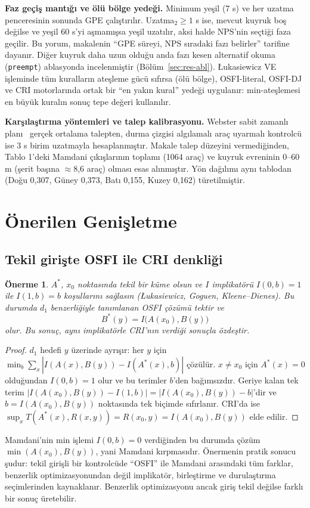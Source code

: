 \documentclass[11pt,a4paper]{article}
\newtheorem{proposition}{Önerme}
\theoremstyle{definition}
\begin{document}
\textbf{Faz geçiş mantığı ve ölü bölge yedeği.} Minimum yeşil (7 s) ve her uzatma penceresinin sonunda GPE çalıştırılır. Uzatma$_2\ge1$ s ise, mevcut kuyruk boş değilse ve yeşil 60 s'yi aşmamışsa yeşil uzatılır, aksi halde NPS'nin seçtiği faza geçilir. Bu yorum, makalenin ``GPE süreyi, NPS sıradaki fazı belirler'' tarifine dayanır. Diğer kuyruk daha uzun olduğu anda fazı kesen alternatif okuma (\texttt{preempt}) ablasyonda incelenmiştir (Bölüm~\ref{sec:res-abl}). Łukasiewicz VE işleminde tüm kuralların ateşleme gücü sıfırsa (ölü bölge), OSFI-literal, OSFI-DJ ve CRI motorlarında ortak bir ``en yakın kural'' yedeği uygulanır: min-ateşlemesi en büyük kuralın sonuç tepe değeri kullanılır.

\textbf{Karşılaştırma yöntemleri ve talep kalibrasyonu.} Webster sabit zamanlı planı~\cite{webster1958} gerçek ortalama talepten, durma çizgisi algılamalı araç uyarmalı kontrolcü ise 3 s birim uzatmayla hesaplanmıştır. Makale talep düzeyini vermediğinden, Tablo 1'deki Mamdani çıkışlarının toplamı (1064 araç) ve kuyruk evreninin 0--60 m (şerit başına $\approx$8,6 araç) olması esas alınmıştır. Yön dağılımı aynı tablodan (Doğu 0,307, Güney 0,373, Batı 0,155, Kuzey 0,162) türetilmiştir.

\section{Önerilen Genişletme}
\label{sec:ext}

\subsection{Tekil girişte OSFI ile CRI denkliği}
\label{sec:prop}

\begin{proposition}
\label{prop:eq}
$A^*$, $x_0$ noktasında tekil bir küme olsun ve $I$ implikatörü $I(0,b)=1$ ile $I(1,b)=b$ koşullarını sağlasın (Łukasiewicz, Goguen, Kleene--Dienes). Bu durumda $d_1$ benzerliğiyle tanımlanan OSFI çözümü tektir ve
\begin{equation}
B^*(y)=I\big(A(x_0),B(y)\big)
\end{equation}
olur. Bu sonuç, aynı implikatörle CRI'nın verdiği sonuçla özdeştir.
\end{proposition}
\begin{proof}
$d_1$ hedefi $y$ üzerinde ayrışır: her $y$ için $\min_{b}\sum_x|I(A(x),B(y))-I(A^*(x),b)|$ çözülür. $x\neq x_0$ için $A^*(x)=0$ olduğundan $I(0,b)=1$ olur ve bu terimler $b$'den bağımsızdır. Geriye kalan tek terim $|I(A(x_0),B(y))-I(1,b)|=|I(A(x_0),B(y))-b|$'dir ve $b=I(A(x_0),B(y))$ noktasında tek biçimde sıfırlanır. CRI'da ise $\sup_xT(A^*(x),R(x,y))=R(x_0,y)=I(A(x_0),B(y))$ elde edilir.
\end{proof}
Mamdani'nin min işlemi $I(0,b)=0$ verdiğinden bu durumda çözüm $\min(A(x_0),B(y))$, yani Mamdani kırpmasıdır. Önermenin pratik sonucu şudur: tekil girişli bir kontrolcüde ``OSFI'' ile Mamdani arasındaki tüm farklar, benzerlik optimizasyonundan değil implikatör, birleştirme ve durulaştırma seçimlerinden kaynaklanır. Benzerlik optimizasyonu ancak giriş tekil değilse farklı bir sonuç üretebilir.
\end{document}
